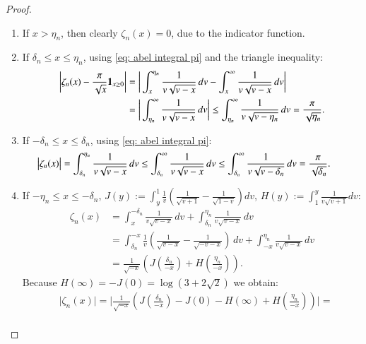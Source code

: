 \begin{proof}
    \begin{enumerate}
        \item If $x > \eta_n$, then clearly $\zeta_n (x) = 0$, due to the indicator function.
        \item If $\delta_n \leq x \leq \eta_n$, using \eqref{eq: abel integral pi} and the triangle inequality:
        \begin{align*}
            \bigg| \zeta_n(x) - \frac{\pi}{\sqrt{x}} \mathbf{1}_{x \geq 0} \bigg| &= \bigg| \int_{x}^{\eta_n}\frac{1}{v\sqrt{v-x}} \, dv - \int_{x}^{\infty}\frac{1}{v\sqrt{v-x}} \, dv \bigg| \\
            & = \bigg| \int_{\eta_n}^{\infty} \frac{1}{v\sqrt{v-x}} \, dv \bigg| \leq \int_{\eta_n}^{\infty} \frac{1}{v\sqrt{v-\eta_n}} \, dv = \frac{\pi}{\sqrt{\eta_n}}.
        \end{align*}
        \item If $-\delta_n \leq x \leq \delta_n$, using \eqref{eq: abel integral pi}:
        \begin{align*}
            \hspace{-0.25cm} \big| \zeta_n(x) \big| &= \int_{\delta_n}^{\eta_n}\frac{1}{v\sqrt{v-x}} \, dv  \leq \int_{\delta_n}^{\infty} \frac{1}{v\sqrt{v-x}} \, dv \leq \int_{\delta_n}^{\infty} \frac{1}{v\sqrt{v-\delta_n}} \, dv = \frac{\pi}{\sqrt{\delta_n}}.
        \end{align*}
        \item If $-\eta_n \leq x \leq-\delta_n$, $J(y) := \int_{y}^{1} \frac{1}{v} \left( \frac{1}{\sqrt{v+1}} - \frac{1}{\sqrt{1-v}}\right)  dv$, $H(y) := \int_{1}^{y} \frac{1}{v \sqrt{v+1}}  dv$:
        \begin{align*}
            \zeta_{n} (x) &= \int_{x}^{-\delta_n} \frac{1}{v\sqrt{v-x}} \, dv + \int_{\delta_n}^{\eta_n} \frac{1}{v \sqrt{v-x}} \, dv  \\
            & = \int_{\delta_n}^{-x} \frac{1}{v} \left( \frac{1}{\sqrt{v-x}} - \frac{1}{\sqrt{-v-x}}\right) \, dv + \int_{-x}^{\eta_n} \frac{1}{v \sqrt{v-x}} \, dv \\
            &= \frac{1}{\sqrt{-x}} \left( J\left(\frac{\delta_n}{-x}\right) + H\left(\frac{\eta_n}{-x}\right) \right).
        \end{align*}
        Because $H(\infty) = -J(0) = \log{(3+2\sqrt{2})}$ we obtain:
        \begin{align*}
            &\big| \zeta_n(x) \big| = \bigg| \frac{1}{\sqrt{-x}} \left( J\left(\frac{\delta_n}{-x}\right) - J(0) - H(\infty)+ H\left(\frac{\eta_n}{-x}\right) \right) \bigg| =\\

\end{align*}
\end{enumerate}
\end{proof}
